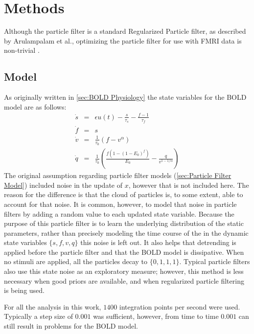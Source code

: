 \chapter{Methods}
\label{sec:Methods}
Although the particle filter  is a standard Regularized
Particle filter, as described by Arulampalam et al., optimizing the
particle filter for use with FMRI data is non-trivial \cite{Arulampalam2002a}.


\section{Model}
As originally written in \autoref{sec:BOLD Physiology} the state variables
for the BOLD model are as follows:
\begin{eqnarray}
\dot{s} &=& \epsilon u(t) - \frac{s}{\tau_s} - \frac{f - 1}{\tau_f} \\
\dot{f} &=& s\\
\dot{v} &=& \frac{1}{\tau_0}(f - v^\alpha)\\
\dot{q} &=& \frac{1}{\tau_0}(\frac{f(1-(1-E_0)^f)}{E_0} - \frac{q}{v^{1-1/\alpha}})
\end{eqnarray}
The original assumption regarding particle filter models (\autoref{sec:Particle Filter Model})
included noise in the update of $x$, however that is not included here.
The reason for the difference is that the cloud of particles is, to some extent,
able to account for that noise. It is common, however, to model that noise
in particle filters by adding a random value to each updated state variable.
Because the purpose of this particle filter is to learn the underlying distribution
of the static parameters, rather than precisely modeling the time course of the
in the dynamic state variables $\{s,f,v,q\}$ this noise is left out. It also helps
that detrending is applied before the particle filter and that the
BOLD model is dissipative. When no stimuli are applied, all the particles
decay to $\{0,1,1,1\}$. Typical particle filters
also use this state noise as an exploratory measure; however, this method is
less necessary when good priors are available, and when regularized particle filtering
is being used.

For all the analysis  in this work, $1400$ integration points
per second were used.  Typically a step size of $0.001$ was sufficient,
however, from time to time $0.001$ can still result in problems for the
BOLD model.

